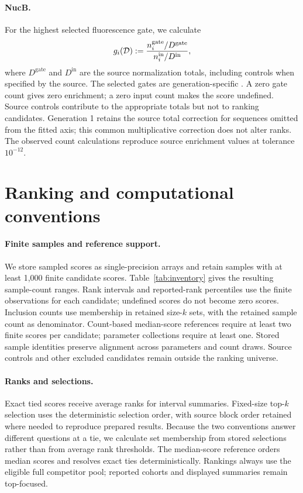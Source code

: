 \paragraph{NucB.}
For the highest selected fluorescence gate, we calculate
\[
g_i(\mathcal{D}):=\frac{n_i^{\mathrm{gate}}/D^{\mathrm{gate}}}
{n_i^{\mathrm{in}}/D^{\mathrm{in}}},
\]
where $D^{\mathrm{gate}}$ and $D^{\mathrm{in}}$ are the source normalization
totals, including controls when specified by the source. The selected gates
are generation-specific \citep{thomas2025}. A zero gate count gives zero
enrichment; a zero input count makes the score undefined. Source controls
contribute to the appropriate totals but not to ranking candidates.
Generation 1 retains the source total correction for sequences omitted
from the fitted axis; this common multiplicative correction does not alter
ranks. The observed count calculations reproduce source enrichment values
at tolerance $10^{-12}$.

\section{Ranking and computational conventions}
\label{app:computation}

\paragraph{Finite samples and reference support.}
We store sampled scores as single-precision arrays and retain samples with
at least 1,000 finite candidate scores. Table~\ref{tab:inventory} gives the
resulting sample-count ranges. Rank intervals and reported-rank percentiles
use the finite observations for each candidate; undefined scores do not
become zero scores. Inclusion counts use membership in retained size-$k$
sets, with the retained sample count as denominator. Count-based median-score
references require at least two finite scores per candidate; parameter
collections require at least one. Stored sample identities preserve
alignment across parameters and count draws. Source controls and other
excluded candidates remain outside the ranking universe.

\paragraph{Ranks and selections.}
Exact tied scores receive average ranks for interval summaries. Fixed-size
top-$k$ selection uses the deterministic selection order, with source block
order retained where needed to reproduce prepared results. Because the two
conventions answer different questions at a tie, we calculate set membership
from stored selections rather than from average rank thresholds. The
median-score reference orders median scores and resolves exact ties
deterministically. Rankings always use the eligible full competitor pool;
reported cohorts and displayed summaries remain top-focused.

